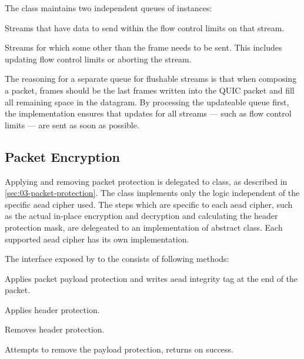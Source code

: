 The \StreamCollection{} class maintains two independent queues of \ManagedQuicStream{} instances:

\begin{itemize}

   Streams that have data to send within the flow control limits on that stream.

   Streams for which some other than the \STREAM{} frame needs to be sent. This
includes updating flow control limits or aborting the stream.

\end{itemize}

The reasoning for a separate queue for flushable streams is that when composing a packet, \STREAM{}
frames should be the last frames written into the QUIC packet and fill all remaining space in the
datagram. By processing the updateable queue first, the implementation ensures that updates for all
streams --- such as flow control limits --- are sent as soon as possible.

\subsection{Packet Encryption}

Applying and removing packet protection is delegated to \CryptoSeal{} class, as described in
\autoref{sec:03-packet-protection}. The \CryptoSeal{} class implements only the logic independent of
the specific \gls{aead} cipher used. The steps which are specific to each \gls{aead} cipher, such as
the actual in-place encryption and decryption and calculating the header protection mask, are
delegeated to an implementation of \CryptoSealAlgorithm{} abstract class. Each supported \gls{aead}
cipher has its own \CryptoSealAlgorithm{} implementation.

The interface exposed by \CryptoSeal{} to the \ManagedQuicConnection{} consists of following
methods:

\begin{description}

     Applies packet payload protection and writes \gls{aead} integrity tag at the end of the packet.

     Applies
header protection.

     Removes
header protection.

     Attempts to remove the payload protection, returns  on success.

\end{description}

